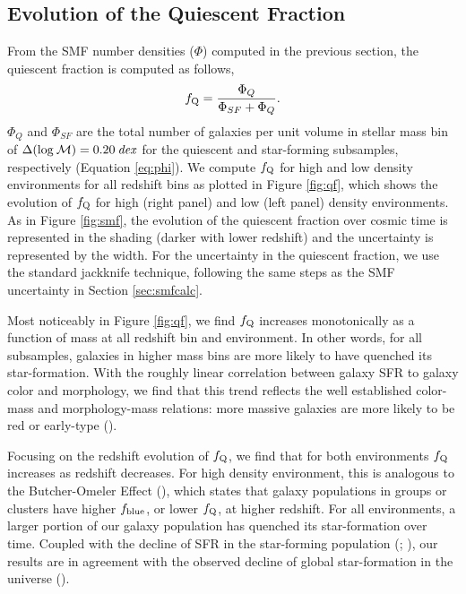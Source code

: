 \documentclass{emulateapj}
\begin{document}
\subsection{Evolution of the Quiescent Fraction} \label{sec:qfevol}
From the SMF number densities ($\Phi$) computed in the previous section, the quiescent fraction is computed as follows, 
\begin{equation}
f_{\rm{Q}} = \frac{\Phi_{Q}}{\Phi_{SF}+\Phi_{Q}}.
\end{equation}
$\Phi_{Q}$ and $\Phi_{SF}$ are the total number of galaxies per unit volume in stellar mass bin of $\Delta(\rm{log} \: \mathcal{M}) = 0.20 \: {\it dex}$ for the quiescent and star-forming subsamples, respectively (Equation \ref{eq:phi}). We compute $f_{\rm{Q}}$ for high and low density environments for all redshift bins as plotted in Figure \ref{fig:qf}, which shows the evolution of $f_{\rm{Q}}$ for high (right panel) and low (left panel) density environments. As in Figure \ref{fig:smf}, the evolution of the quiescent fraction over cosmic time is represented in the shading (darker with lower redshift) and the uncertainty is represented by the width. For the uncertainty in the quiescent fraction, we use the standard jackknife technique, following the same steps as the SMF uncertainty in Section \ref{sec:smfcalc}. 

Most noticeably in Figure \ref{fig:qf}, we find $f_{\rm{Q}}$ increases monotonically as a function of mass at all redshift bin and environment. In other words, for all subsamples, galaxies in higher mass bins are more likely to have quenched its star-formation. With the roughly linear correlation between galaxy SFR to galaxy color and morphology, we find that this trend reflects the well established color-mass and morphology-mass relations: more massive galaxies are more likely to be red or early-type (\cite{blanton09a}). 

Focusing on the redshift evolution of $f_{\rm{Q}}$, we find that for both environments $f_{\rm{Q}}$ increases as redshift decreases. For high density environment, this is analogous to the Butcher-Omeler Effect (\cite{Butcher:1984aa}), which states that galaxy populations in groups or clusters have higher $f_{\rm{blue}}$, or lower $f_{\rm{Q}}$, at higher redshift. For all environments, a larger portion of our galaxy population has quenched its star-formation over time. Coupled with the decline of SFR in the star-forming population (\cite{Noeske:2007aa}; \cite{cooper08a}), our results are in agreement with the observed decline of global star-formation in the universe (\cite{hopkins06a}). %
\end{document}
